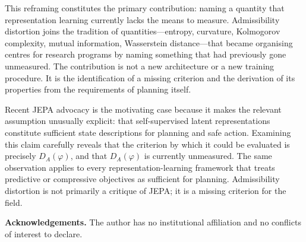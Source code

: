 \documentclass[11pt, a4paper]{article}
\theoremstyle{plain}
\theoremstyle{definition}
\theoremstyle{remark}
\newcommand{\DA}{D_A(\varphi)}
\begin{document}
This reframing constitutes the primary contribution: naming a quantity that
representation learning currently lacks the means to measure. Admissibility
distortion joins the tradition of quantities---entropy, curvature, Kolmogorov
complexity, mutual information, Wasserstein distance---that became organising
centres for research programs by naming something that had previously gone
unmeasured. The contribution is not a new architecture or a new training
procedure. It is the identification of a missing criterion and the derivation
of its properties from the requirements of planning itself.

Recent JEPA advocacy is the motivating case because it makes the relevant
assumption unusually explicit: that self-supervised latent representations
constitute sufficient state descriptions for planning and safe action. Examining
this claim carefully reveals that the criterion by which it could be evaluated
is precisely $\DA$, and that $\DA$ is currently unmeasured. The same observation
applies to every representation-learning framework that treats predictive or
compressive objectives as sufficient for planning. Admissibility distortion is
not primarily a critique of JEPA; it is a missing criterion for the field.

\bigskip

\noindent\textbf{Acknowledgements.} The author has no institutional affiliation
and no conflicts of interest to declare.

\bigskip
\end{document}

